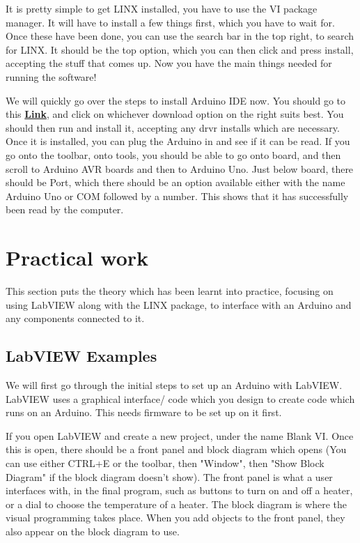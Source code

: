 \documentclass[a4paper,11pt]{report}
\let\oldhref\href %
\renewcommand{\href}[2]{\oldhref{#1}{\bfseries#2}}
\begin{document}
It is pretty simple to get LINX installed, you have to use the VI package manager. It will have to install a few things first, which you have to wait for. Once these have been done, you can use the search bar in the top right, to search for LINX. It should be the top option, which you can then click and press install, accepting the stuff that comes up. Now you have the main things needed for running the software!

We will quickly go over the steps to install Arduino IDE now. You should go to this \href{https://www.arduino.cc/en/software}{Link}, and click on whichever download option on the right suits best. You should then run and install it, accepting any \gls{drvr} installs which are necessary. Once it is installed, you can plug the Arduino in and see if it can be read. If you go onto the toolbar, onto tools, you should be able to go onto board, and then scroll to Arduino AVR boards and then to Arduino Uno. Just below board, there should be Port, which there should be an option available either with the name Arduino Uno or COM followed by a number. This shows that it has successfully been read by the computer.

\pagebreak

\section{Practical work}

This section puts the theory which has been learnt into practice, focusing on using LabVIEW along with the LINX package, to interface with an Arduino and any components connected to it.

\vspace*{1\baselineskip}

\subsection{LabVIEW Examples}

We will first go through the initial steps to set up an Arduino with LabVIEW. LabVIEW uses a graphical interface/ code which you design to create code which runs on an Arduino. This needs firmware to be set up on it first.

If you open LabVIEW and create a new project, under the name Blank VI. Once this is open, there should be a front panel and block diagram which opens (You can use either CTRL+E or the toolbar, then "Window", then "Show Block Diagram" if the block diagram doesn't show). The front panel is what a user interfaces with, in the final program, such as buttons to turn on and off a heater, or a dial to choose the temperature of a heater. The block diagram is where the visual programming takes place. When you add objects to the front panel, they also appear on the block diagram to use.
\end{document}
